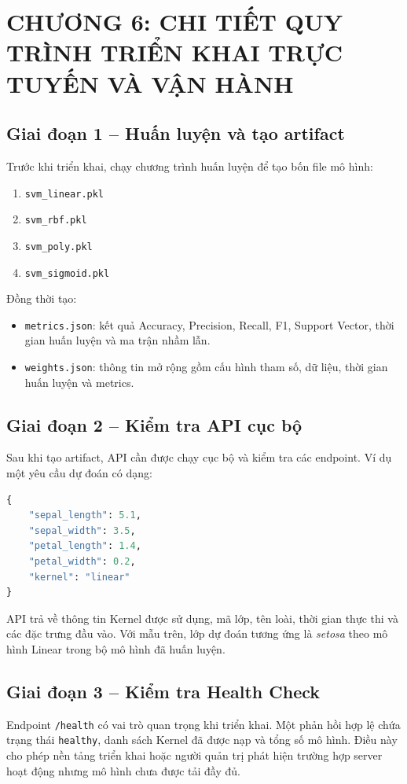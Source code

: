 \documentclass{article}
\begin{document}
	\newpage
	\section{\centering CHƯƠNG 6: CHI TIẾT QUY TRÌNH TRIỂN KHAI TRỰC TUYẾN VÀ VẬN HÀNH}
	\subsection{Giai đoạn 1 -- Huấn luyện và tạo artifact}
	\hspace{0.5cm}
	Trước khi triển khai, chạy chương trình huấn luyện để tạo bốn file mô hình:
	\begin{enumerate}
		\item \texttt{svm\_linear.pkl}
		\item \texttt{svm\_rbf.pkl}
		\item \texttt{svm\_poly.pkl}
		\item \texttt{svm\_sigmoid.pkl}
	\end{enumerate}
	
	Đồng thời tạo:
	\begin{itemize}
		\item \texttt{metrics.json}: kết quả Accuracy, Precision, Recall, F1, Support Vector, thời gian huấn luyện và ma trận nhầm lẫn.
		\item \texttt{weights.json}: thông tin mở rộng gồm cấu hình tham số, dữ liệu, thời gian huấn luyện và metrics.
	\end{itemize}
	
	\subsection{Giai đoạn 2 -- Kiểm tra API cục bộ}
	\hspace{0.5cm}
	Sau khi tạo artifact, API cần được chạy cục bộ và kiểm tra các endpoint. Ví dụ một yêu cầu dự đoán có dạng:
	\begin{lstlisting}[language=Python,caption={Dữ liệu JSON gửi đến endpoint /predict}]
{
	"sepal_length": 5.1,
	"sepal_width": 3.5,
	"petal_length": 1.4,
	"petal_width": 0.2,
	"kernel": "linear"
}
	\end{lstlisting}
	
	API trả về thông tin Kernel được sử dụng, mã lớp, tên loài, thời gian thực thi và các đặc trưng đầu vào. Với mẫu trên, lớp dự đoán tương ứng là \textit{setosa} theo mô hình Linear trong bộ mô hình đã huấn luyện.
	
	\subsection{Giai đoạn 3 -- Kiểm tra Health Check}
	\hspace{0.5cm}
	Endpoint \texttt{/health} có vai trò quan trọng khi triển khai. Một phản hồi hợp lệ chứa trạng thái \texttt{healthy}, danh sách Kernel đã được nạp và tổng số mô hình. Điều này cho phép nền tảng triển khai hoặc người quản trị phát hiện trường hợp server hoạt động nhưng mô hình chưa được tải đầy đủ.
	
\end{document}
